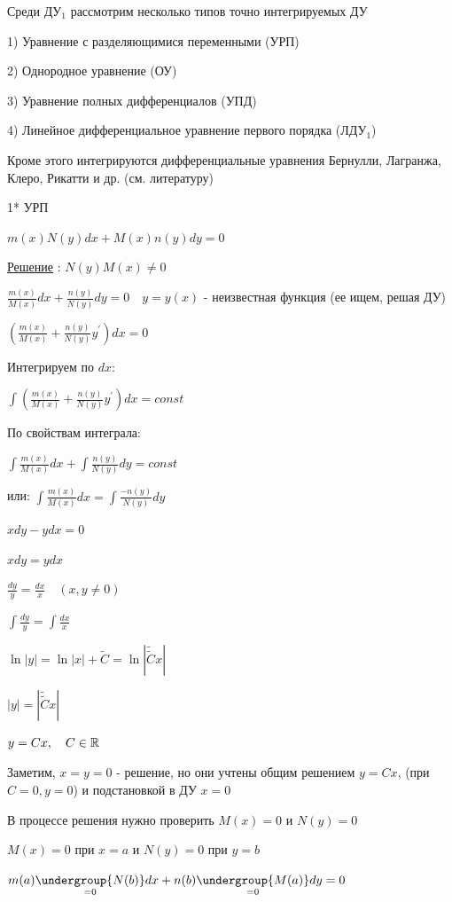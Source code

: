 \documentclass[12pt]{article}
\begin{document}
    \Nota Среди ДУ$_1$ рассмотрим несколько типов точно интегрируемых ДУ

    1) Уравнение с разделяющимися переменными (УРП)

    2) Однородное уравнение (ОУ)

    3) Уравнение полных дифференциалов (УПД)

    4) Линейное дифференциальное уравнение первого порядка (ЛДУ$_1$)

    Кроме этого интегрируются дифференциальные уравнения Бернулли, Лагранжа, Клеро, Рикатти и др. (см. литературу)

    1* УРП

    \Def $m(x)N(y)dx + M(x)n(y)dy = 0$

    \underline{Решение} : $N(y)M(x) \neq 0$

    $\frac{m(x)}{M(x)}dx + \frac{n(y)}{N(y)}dy = 0 \quad y = y(x)$ - неизвестная функция (ее ищем, решая ДУ)

    $(\frac{m(x)}{M(x)} + \frac{n(y)}{N(y)}y^\prime)dx = 0$

    Интегрируем по $dx$:

    $\int \left(\frac{m(x)}{M(x)} + \frac{n(y)}{N(y)}y^\prime\right)dx = const$

    По свойствам интеграла:

    $\int \frac{m(x)}{M(x)}dx + \int\frac{n(y)}{N(y)}dy = const$

    или: $\int \frac{m(x)}{M(x)}dx = \int\frac{-n(y)}{N(y)}dy$

    \Ex $xdy - ydx = 0$

    $xdy = ydx$

    $\frac{dy}{y} = \frac{dx}{x} \quad (x, y \neq 0)$

    $\int \frac{dy}{y} = \int \frac{dx}{x}$

    $\ln|y| = \ln|x| + \tilde{C} = \ln|\tilde{\tilde{C}}x|$

    $|y| = |\tilde{\tilde{C}}x|$

    $y = Cx, \quad C \in \mathbb{R}$

    Заметим, $x = y = 0$ - решение, но они учтены общим решением $y = Cx$, (при $C = 0, y = 0$) и подстановкой в ДУ $x = 0$

    \Nota В процессе решения нужно проверить $M(x) = 0$ и $N(y) = 0$

    $M(x) = 0$ при $x = a$ и $N(y) = 0$ при $y = b$

    $m(a)\underset{=0}{\undergroup{N(b)}}dx + n(b)\underset{=0}{\undergroup{M(a)}}dy = 0$
\end{document}
